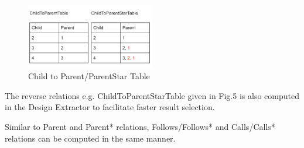 \documentclass[12pt]{article}
\begin{document}
{{{{{{{{{{{{{\begin{figure}[htbp]
  \caption{Child to Parent/ParentStar Table}
  \centering  \includegraphics[width=0.5\textwidth]{ParentTable2.png}
\end{figure}
\vspace{4mm}
The reverse relations e.g. ChildToParentStarTable given in Fig.5 is also computed in the Design Extractor to facilitate faster result selection.

Similar to Parent and Parent* relations, Follows/Follows* and Calls/Calls* relations can be computed in the same manner.

}}}}}}}}}}}}}
\end{document}
